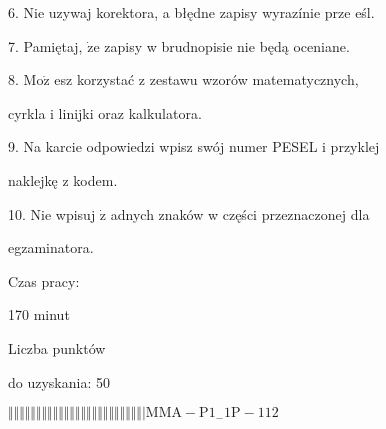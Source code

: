 \documentclass[a4paper,12pt]{article}
\begin{document}
6. Nie uzywaj korektora, a błędne zapisy wyrazínie prze eśl.

7. Pamiętaj, $\dot{\mathrm{z}}\mathrm{e}$ zapisy w brudnopisie nie będą oceniane.

8. $\mathrm{M}\mathrm{o}\dot{\mathrm{z}}$ esz korzystać z zestawu wzorów matematycznych,

cyrkla i linijki oraz kalkulatora.

9. Na karcie odpowiedzi wpisz swój numer PESEL i przyklej

naklejkę z kodem.

10. Nie wpisuj $\dot{\mathrm{z}}$ adnych znaków w części przeznaczonej dla

egzaminatora.

Czas pracy:

170 minut

Liczba punktów

do uzyskania: 50

$\Vert\Vert\Vert\Vert\Vert\Vert\Vert\Vert\Vert\Vert\Vert\Vert\Vert\Vert\Vert\Vert\Vert\Vert\Vert\Vert\Vert\Vert\Vert\Vert|  \mathrm{M}\mathrm{M}\mathrm{A}-\mathrm{P}1_{-}1\mathrm{P}-112$
\end{document}

